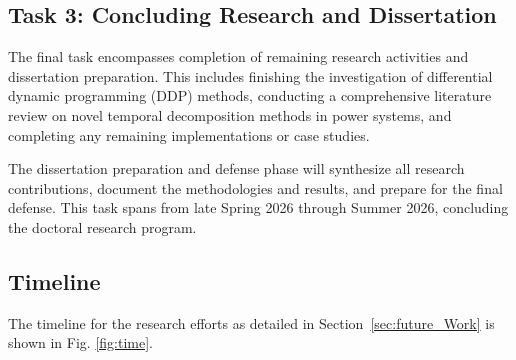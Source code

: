 \subsection{Task 3: Concluding Research and Dissertation}
The final task encompasses completion of remaining research activities and dissertation preparation. This includes finishing the investigation of differential dynamic programming (DDP) methods, conducting a comprehensive literature review on novel temporal decomposition methods in power systems, and completing any remaining implementations or case studies.

The dissertation preparation and defense phase will synthesize all research contributions, document the methodologies and results, and prepare for the final defense. This task spans from late Spring 2026 through Summer 2026, concluding the doctoral research program.    

\clearpage
\subsection{Timeline}
The timeline for the research efforts as detailed in Section~\ref{sec:future_Work} is shown in Fig. \ref{fig:time}.

